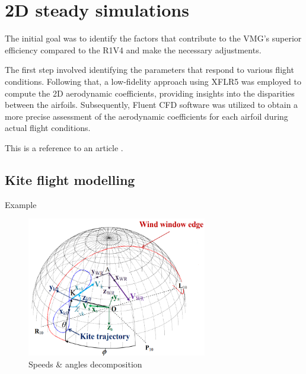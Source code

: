 
\chapter{2D steady simulations} 	%
\label{Chapter1} 		%


The initial goal was to identify the factors that contribute to the VMG's superior efficiency compared to the R1V4 and make the necessary adjustments.

The first step involved identifying the parameters that respond to various flight conditions. Following that, a low-fidelity approach using XFLR5 was employed to compute the 2D aerodynamic coefficients, providing insights into the disparities between the airfoils. Subsequently, Fluent CFD software was utilized to obtain a more precise assessment of the aerodynamic coefficients for each airfoil during actual flight conditions.

This is a reference to an article \cite{example}.


\section{Kite flight modelling}
\label{sec:Ch1.1}

Example
\begin{figure}[H]
    \centering
    \includegraphics[width=0.7\textwidth]{figures/2D steady simulations/kite flight modeling 1.png}
    \caption{Speeds \& angles decomposition}
    \label{fig:Kite_flight_modelling}
\end{figure}


